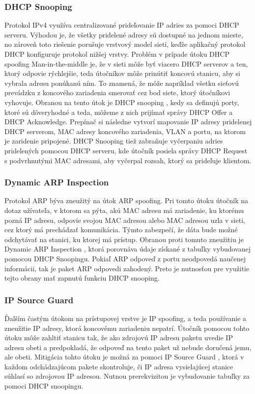 \subsubsection*{DHCP Snooping}
Protokol IPv4 využíva centralizované prideľovanie IP adries za pomoci DHCP serveru. Výhodou je, že všetky pridelené adresy sú dostupné na jednom mieste, no zároveň toto riešenie porušuje vrstvový model sietí, keďže aplikačný protokol DHCP konfiguruje protokol nižšej vrstvy. Problém v prípade útoku DHCP spoofing Man-in-the-middle je, že v sieti môže byť viacero DHCP serverov a ten, ktorý odpovie rýchlejšie, teda útočníkov môže prinútiť koncovú stanicu, aby si vybrala adresu ponúkanú ním. To znamená, že môže napríklad všetku sieťovú prevádzku z koncového zariadenia smerovať cez bod siete, ktorý útočníkovi vyhovuje. Obranou na tento útok je DHCP snooping \cite{Vyncke2008} \cite{Singh2018}, kedy sa definujú porty, ktoré sú dôveryhodné a teda, môžeme z nich prijímať správy DHCP Offer a DHCP Acknowledge. Prepínač si následne vytvorí mapovanie IP adresy pridelenej DHCP serverom, MAC adresy koncového zariadenia, VLAN a portu, na ktorom je zaridenie pripojené. DHCP Snooping tiež zabraňuje vyčerpaniu adries pridelených pomocou DHCP serveru, kde útočník posiela správy DHCP Request s podvrhnutými MAC adresami, aby vyčerpal rozsah, ktorý sa prideľuje klientom.

\subsubsection*{Dynamic ARP Inspection}
Protokol ARP býva zneužitý na útok ARP spoofing. Pri tomto útoku útočník na dotaz užívateľa, v ktorom sa pýta, akú MAC adresu má zariadenie, ku ktorému pozná IP adresu, odpovie svojou MAC adresou alebo MAC adresou uzla v sieti, cez ktorý má prechádzať komunikácia. Týmto zabezpečí, že dáta bude možné odchytávať na stanici, ku ktorej má prístup. Obranou proti tomuto zneužitiu je Dynamic ARP Inspection \cite{McMillan2018}, ktorá porovnáva údaje získané z tabuľky vybudovanej pomocou DHCP Snoopingu. Pokiaľ ARP odpoveď z portu neodpovedá naučenej informácii, tak je paket ARP odpovedi zahodený. Preto je nutnosťou pre využitie tejto obrany mať zapnutú funkciu DHCP snooping.

\subsubsection*{IP Source Guard}
Ďalším častým útokom na prístupovej vrstve je IP spoofing, a teda používanie a zneužitie IP adresy, ktorá koncovému zariadeniu nepatrí. Útočník pomocou tohto útoku môže zahltiť stanicu tak, že ako zdrojovú IP adresu paketu uvedie IP adresu obeti a predpokladá, že odpoveď na tento paket už nebude doručená jemu, ale obeti. Mitigácia tohto útoku je možná za pomoci IP Source Guard \cite{Singh2018}, ktorá v každom odchádzajúcom pakete skontroluje, či IP adresa vysielajúcej stanice súhlasí so zdrojovou IP adresou. Nutnou prerekvizitou je vybudovanie tabuľky za pomoci DHCP snoopingu.    

